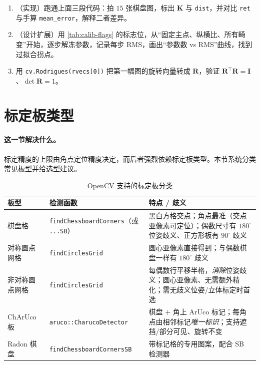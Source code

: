 \begin{practice}[练习]
\begin{enumerate}
  \item （实现）跑通上面三段代码：拍 $15$ 张棋盘图，标出 $\mathbf{K}$ 与 \texttt{dist}，并对比 \texttt{ret} 与手算 \texttt{mean\_error}，解释二者差异。
  \item （设计扩展）用 \cref{tab:calib-flags} 的标志位，从“固定主点、纵横比、所有畸变”开始，逐步解冻参数，记录每步 RMS，画出“参数数 vs RMS”曲线，找到过拟合拐点。
  \item 用 \texttt{cv.Rodrigues(rvecs[0])} 把第一幅图的旋转向量转成 $\mathbf{R}$，验证 $\mathbf{R}^\top\mathbf{R}=\mathbf{I}$、$\det\mathbf{R}=1$。
\end{enumerate}
\end{practice}

\section{标定板类型}
\label{sec:calib-boards}

\paragraph{这一节解决什么。}
标定精度的上限由角点定位精度决定，而后者强烈依赖标定板类型。本节系统分类常见板型并给选型建议。

\begin{table}[ht]\centering\small
\caption{OpenCV 支持的标定板分类\cite{opencv2024pattern,garrido2014aruco}}
\label{tab:calib-boards}
\begin{tabular}{p{} p{} p{}}
\toprule
板型 & 检测函数 & 特点 / 歧义 \\
\midrule
棋盘格 & \texttt{findChessboardCorners}（或 \texttt{...SB}）& 黑白方格交点；角点最准（交点亚像素可定位）；偶数尺寸有 $180^\circ$ 位姿歧义、正方形板有 $90^\circ$ 歧义 \\
对称圆点网格 & \texttt{findCirclesGrid} & 圆心亚像素直接得到；与偶数棋盘一样有 $180^\circ$ 歧义 \\
非对称圆点网格 & \texttt{findCirclesGrid} & 每偶数行平移半格，\emph{消除}位姿歧义；圆心亚像素、无需额外精化；需无歧义位姿/立体标定时首选 \\
ChArUco 板 & \texttt{aruco::CharucoDetector} & 棋盘 $+$ 角上 ArUco 标记；每角点由相邻标记\emph{唯一标识}；支持遮挡/部分可见、旋转不变 \\
Radon 棋盘 & \texttt{findChessboardCornersSB} & 带标记格的专用图案，配合 SB 检测器 \\
\bottomrule
\end{tabular}
\end{table}

